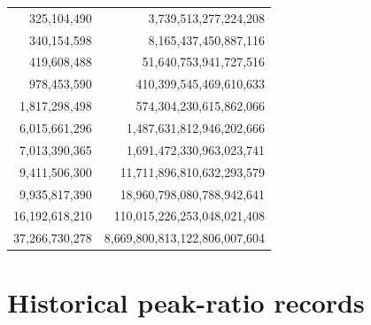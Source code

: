 \documentclass[11pt]{article}
\theoremstyle{definition}
\begin{document}
\begin{longtable}{r r}
325{,}104{,}490 & 3{,}739{,}513{,}277{,}224{,}208 \\
340{,}154{,}598 & 8{,}165{,}437{,}450{,}887{,}116 \\
419{,}608{,}488 & 51{,}640{,}753{,}941{,}727{,}516 \\
978{,}453{,}590 & 410{,}399{,}545{,}469{,}610{,}633 \\
1{,}817{,}298{,}498 & 574{,}304{,}230{,}615{,}862{,}066 \\
6{,}015{,}661{,}296 & 1{,}487{,}631{,}812{,}946{,}202{,}666 \\
7{,}013{,}390{,}365 & 1{,}691{,}472{,}330{,}963{,}023{,}741 \\
9{,}411{,}506{,}300 & 11{,}711{,}896{,}810{,}632{,}293{,}579 \\
9{,}935{,}817{,}390 & 18{,}960{,}798{,}080{,}788{,}942{,}641 \\
16{,}192{,}618{,}210 & 110{,}015{,}226{,}253{,}048{,}021{,}408 \\
37{,}266{,}730{,}278 & 8{,}669{,}800{,}813{,}122{,}806{,}007{,}604 \\
\bottomrule
\end{longtable}

\section{Historical peak-ratio records}
\end{document}
